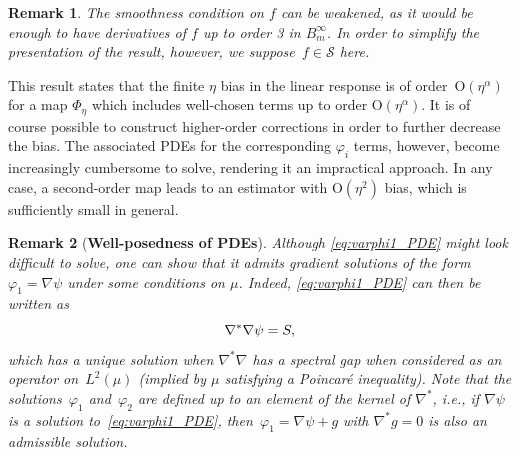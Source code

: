 \documentclass[11pt]{article}
\renewcommand{\S}{\mathscr{S}}
\newcommand{\bigO}{\mathrm{O}}
\newtheorem{remark}{Remark}
\theoremstyle{definition}
\begin{document}
\begin{remark}
The smoothness condition on $f$ can be weakened, as it would be enough to have derivatives of $f$ up to order 3 in $B^\infty_m$. In order to simplify the presentation of the result, however, we suppose~$f\in \S$ here.
\end{remark}

This result states that the finite $\eta$ bias in the linear response is of order~$\bigO(\eta^{\alpha})$ for a map $\Phi_\eta$ which includes well-chosen terms up to order $\bigO(\eta^\alpha)$. It is of course possible to construct higher-order corrections in order to further decrease the bias. The associated PDEs for the corresponding $\varphi_i$ terms, however, become increasingly cumbersome to solve, rendering it an impractical approach. In any case, a second-order map leads to an estimator with $\bigO(\eta^2)$ bias, which is sufficiently small in general.

\begin{remark}[{\bf Well-posedness of PDEs}]
Although \eqref{eq:varphi1_PDE} might look difficult to solve, one can show that it admits gradient solutions of the form $\varphi_1 = \nabla\psi$ under some conditions on $\mu$. Indeed, \eqref{eq:varphi1_PDE} can then be written as
\begin{equation}
    \notag
	\nabla^*\nabla \psi = S, \end{equation}
which has a unique solution when $\nabla^*\nabla$ has a spectral gap when considered as an operator on~$L^2(\mu)$ (implied by $\mu$ satisfying a Poincar\'e inequality). Note that the solutions~$\varphi_1$ and~$\varphi_2$ are defined up to an element of the kernel of $\nabla^*$, i.e., if $\nabla\psi$ is a solution to~\eqref{eq:varphi1_PDE}, then~$\varphi_1 = \nabla\psi + g$ with $\nabla^*g = 0$ is also an admissible solution. \end{remark}
\end{document}
